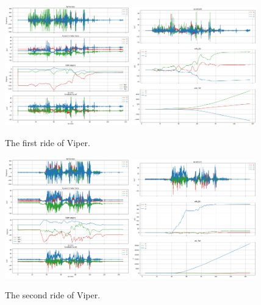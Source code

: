 \documentclass[%
 reprint,
 amsmath,amssymb,
 aps,
]{revtex4-2}
\begin{document}
\begin{figure}[h]
\includegraphics[width=0.48\textwidth]{viper1.png}
\includegraphics[width=0.48\textwidth]{viper1_integrate.png}
\caption{\label{viper1}The first ride of Viper.}
\end{figure}

\begin{figure}[h]
\includegraphics[width=0.48\textwidth]{viper2.png}
\includegraphics[width=0.48\textwidth]{viper2_integrate.png}
\caption{\label{viper2}The second ride of Viper.}
\end{figure}
\end{document}

